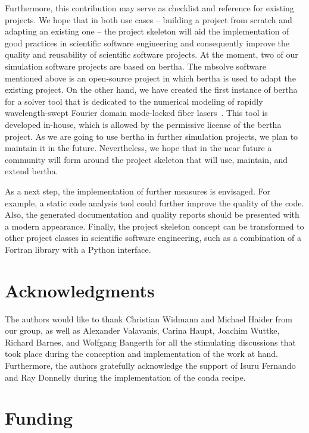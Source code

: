 \documentclass[@CLASSOPTIONS@]{tumarticle}
\begin{document}
Furthermore, this contribution may serve as checklist and reference for
existing projects. We hope that in both use cases -- building a project
from scratch and adapting an existing one -- the project skeleton will aid
the implementation of good practices in scientific software engineering and
consequently improve the quality and reusability of scientific software
projects.
At the moment, two of our simulation software projects are based on bertha.
The mbsolve software mentioned above is an open-source project in which
bertha is used to adapt the existing project. On the other hand, we have
created the first instance of bertha for a solver tool that is dedicated to
the numerical modeling of rapidly wavelength-swept Fourier domain mode-locked
fiber lasers~\cite{jirauschek2015fdml,jirauschek2017josab}. This tool is
developed in-house, which is allowed by the permissive license of the bertha
project. As we are going to use bertha in further simulation projects, we
plan to maintain it in the future. Nevertheless, we hope that in the near
future a community will form around the project skeleton that will use,
maintain, and extend bertha.

As a next step, the implementation of further measures is envisaged. For
example, a static code analysis tool could further improve the quality of
the code. Also, the generated documentation and quality reports should be
presented with a modern appearance. Finally, the project skeleton concept
can be transformed to other project classes in scientific software
engineering, such as a combination of a Fortran library with a Python
interface.

\section*{Acknowledgments}

The authors would like to thank Christian Widmann and Michael Haider from our
group, as well as Alexander Valavanis, Carina Haupt, Joachim Wuttke, Richard
Barnes, and Wolfgang Bangerth for all the stimulating discussions that took
place during the conception and implementation of the work at hand.
Furthermore, the authors gratefully acknowledge the support of Isuru
Fernando and Ray Donnelly during the implementation of the conda recipe.

\section*{Funding}
\end{document}
